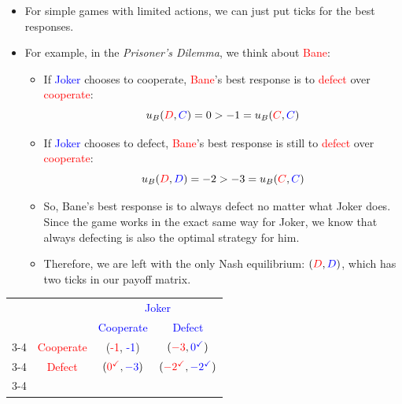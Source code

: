 \documentclass[notitlepage]{article}
\begin{document}
\begin{itemize}
\begin{enumerate}
    \end{enumerate}
    \item For simple games with limited actions, we can just put ticks for the best responses.
    \item For example, in the \textit{Prisoner's Dilemma}, we think about \textcolor{red}{Bane}:
    \begin{itemize}
        \item If \textcolor{blue}{Joker} chooses to cooperate, \textcolor{red}{Bane}'s best response is to \textcolor{red}{defect} over \textcolor{red}{cooperate}:
        \[
        u_B(\textcolor{red}{D}, \textcolor{blue}{C}) = 0 > -1 = u_B(\textcolor{red}{C}, \textcolor{blue}{C})
        \]
        \item If \textcolor{blue}{Joker} chooses to defect, \textcolor{red}{Bane}'s best response is still to \textcolor{red}{defect} over \textcolor{red}{cooperate}:
        \[
        u_B(\textcolor{red}{D}, \textcolor{blue}{D}) = -2 > -3 = u_B(\textcolor{red}{C}, \textcolor{blue}{C})
        \]
        \item So, Bane's best response is to always defect no matter what Joker does. Since the game works in the exact same way for Joker, we know that always defecting is also the optimal strategy for him.
        \item Therefore, we are left with the only Nash equilibrium: \((\textcolor{red}{D}, \textcolor{blue}{D})\), which has two ticks in our payoff matrix.
    \end{itemize}
\end{itemize}

\begin{table}[h]
\begin{center}
\begin{tabular}{llcc}
&&
\multicolumn{2}{c}{\textcolor{blue}{Joker}}  \\&& 
\textcolor{blue}{Cooperate} & 
\textcolor{blue}{Defect} 
\\ \cline{3-4} 
\multirow{2}{*}{\textcolor{red}{Bane}} & 
\multicolumn{1}{c|}{\textcolor{red}{Cooperate}} & 
\multicolumn{1}{c|}{(\textcolor{red}{-1}, \textcolor{blue}{-1})} &
\multicolumn{1}{c|}{$(\textcolor{red}{-3}, \textcolor{blue}{0^\checkmark})$}
\\ \cline{3-4} & 
\multicolumn{1}{c|}{\textcolor{red}{Defect}} & 
\multicolumn{1}{c|}{$(\textcolor{red}{0^\checkmark}, \textcolor{blue}{-3})$}  &
\multicolumn{1}{c|}{$(\textcolor{red}{-2^\checkmark}, \textcolor{blue}{-2^\checkmark})$}
\\ \cline{3-4} 
\end{tabular}
\end{center}
\end{table}
\end{document}
